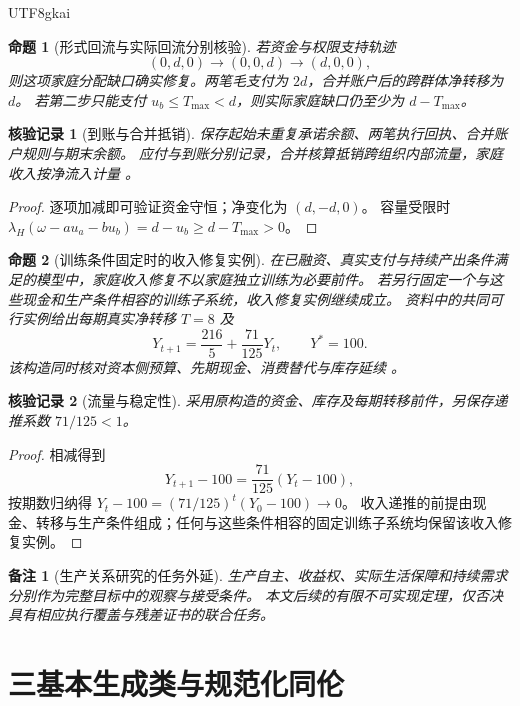 \documentclass[12pt,a4paper,openany]{report}
\newtheorem{proposition}{命题}[chapter]
\newtheorem{remark}{备注}[chapter]
\newtheorem{Certificate}{核验记录}[chapter]
\numberwithin{equation}{chapter}
\begin{document}
\begin{CJK*}{UTF8}{gkai}
\begin{proposition}[形式回流与实际回流分别核验]
若资金与权限支持轨迹
\[
 (0,d,0)\longrightarrow(0,0,d)\longrightarrow(d,0,0),
\]
则这项家庭分配缺口确实修复。两笔毛支付为 $2d$，合并账户后的跨群体净转移为 $d$。
若第二步只能支付 $u_b\le T_{\max}<d$，则实际家庭缺口仍至少为 $d-T_{\max}$。
\end{proposition}
\begin{Certificate}[到账与合并抵销]
保存起始未重复承诺余额、两笔执行回执、合并账户规则与期末余额。
应付与到账分别记录，合并核算抵销跨组织内部流量，家庭收入按净流入计量
\cite[《市场参与的形式系统》，定义“两个收入群体与同口径资金用途”；
《后 AI 转型中的分配传导失灵与可核验治理》，“应付、到账与可保留收入的分离”节]{SourceMarket,SourceSupplement}。
\end{Certificate}
\begin{proof}
逐项加减即可验证资金守恒；净变化为 $(d,-d,0)$。
容量受限时 $\lambda_H(\omega-au_a-bu_b)=d-u_b\ge d-T_{\max}>0$。
\end{proof}

\begin{proposition}[训练条件固定时的收入修复实例]
\label{prop:income-not-training}
在已融资、真实支付与持续产出条件满足的模型中，家庭收入修复不以家庭独立训练为必要前件。
若另行固定一个与这些现金和生产条件相容的训练子系统，收入修复实例继续成立。
资料中的共同可行实例给出每期真实净转移 $T=8$ 及
\[
 Y_{t+1}=\frac{216}{5}+\frac{71}{125}Y_t,
 \qquad Y^*=100.
\]
该构造同时核对资本侧预算、先期现金、消费替代与库存延续
\cite[《市场参与的形式系统》，定理“微观合同与总量收入的一个共同可行实例”]{SourceMarket}。
\end{proposition}
\begin{Certificate}[流量与稳定性]
采用原构造的资金、库存及每期转移前件，另保存递推系数 $71/125<1$。
\end{Certificate}
\begin{proof}
相减得到
\[
 Y_{t+1}-100=\frac{71}{125}(Y_t-100),
\]
按期数归纳得 $Y_t-100=(71/125)^t(Y_0-100)\to0$。
收入递推的前提由现金、转移与生产条件组成；任何与这些条件相容的固定训练子系统均保留该收入修复实例。
\end{proof}

\begin{remark}[生产关系研究的任务外延]
生产自主、收益权、实际生活保障和持续需求分别作为完整目标中的观察与接受条件。
本文后续的有限不可实现定理，仅否决具有相应执行覆盖与残差证书的联合任务。
\end{remark}

\chapter{三基本生成类与规范化同伦}
\label{chap:three}


\end{CJK*}
\end{document}
